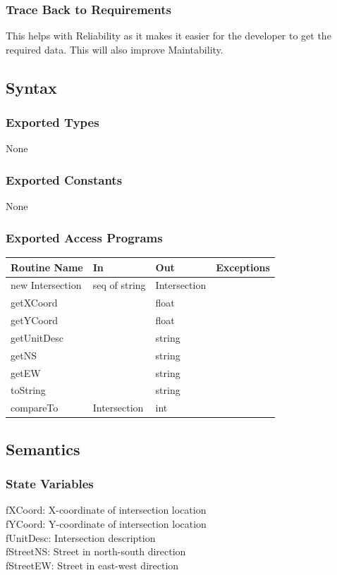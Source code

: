 \documentclass[12pt]{article}
\begin{document}
\subsubsection*{Trace Back to Requirements}
This helps with Reliability as it makes it easier for the developer to get the required data. This will also improve Maintability.

\subsection*{Syntax}
\subsubsection*{Exported Types}
None

\subsubsection*{Exported Constants}
None

\subsubsection*{Exported Access Programs}
    \begin{tabular}{|l|l|l|l|}
    \hline
    \textbf{Routine Name} & \textbf{In} & \textbf{Out} & \textbf{Exceptions}\\
    \hline
    new Intersection & seq of string & Intersection & ~\\
    \hline
    getXCoord & ~ & float & ~\\
    \hline
    getYCoord & ~ & float & ~\\
    \hline
    getUnitDesc & ~ & string & ~\\
    \hline
    getNS & ~ & string & ~\\
    \hline
    getEW & ~ & string & ~\\
    \hline
    toString & ~ & string & ~\\
    \hline
    compareTo & Intersection & int & ~\\
    \hline
    \end{tabular}
    
\subsection*{Semantics}
\subsubsection*{State Variables}
fXCoord: X-coordinate of intersection location\\
fYCoord: Y-coordinate of intersection location\\
fUnitDesc: Intersection description\\
fStreetNS: Street in north-south direction\\
fStreetEW: Street in east-west direction
\end{document}
